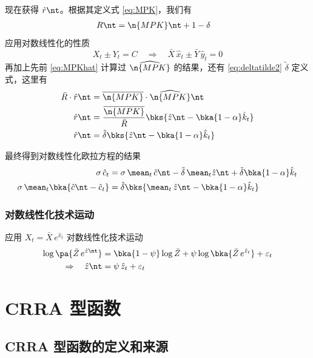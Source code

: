 现在获得 \(\hat r\nt\)。根据其定义式 \ref{eq:MPK}，我们有
\begin{align*}
R\nt&=\n{MPK}\nt+1-\delta
\end{align*}
应用对数线性化的性质
\begin{equation*}
    X_t\pm Y_t=C\quad\Rightarrow\quad \bar X\,\hat x_t\pm\bar Y\,\hat y_t=0
\end{equation*}
再加上先前 \ref{eq:MPKhat} 计算过 \(\widehat{\n{MPK}}\) 的结果，还有 \ref{eq:deltatilde2} \(\tilde\delta\) 定义式，这里有
\begin{align*}
    \bar R\cdot\hat r\nt&=\overline{\n{MPK}} \cdot\widehat{\n{MPK}}\nt\\
    \hat r\nt&=\dfrac{\overline{\n{MPK}}}{\bar R}\bks{\hat z\nt-\bka{1-\alpha}\hat k_t}\\
    \hat r\nt&=\tilde\delta\bks{\hat z\nt-\bka{1-\alpha}\hat k_t}
\end{align*}

最终得到对数线性化欧拉方程的结果
\begin{align*}
    \sigma\,\hat c_t&=\sigma\,\mean_t\,\hat c\nt-\tilde\delta\,\mean_t\hat z\nt+\tilde\delta\bka{1-\alpha}\hat k_t\\
    \sigma\,\mean_t\bka{\hat c\nt-\hat c_t}&=\tilde\delta\bks{\mean_t\,\hat z\nt-\bka{1-\alpha}\hat k_t}
\end{align*}

\subsubsection{对数线性化技术运动}

应用 \(X_t=\bar X\,e^{\hat x_t}\) 对数线性化技术运动
\begin{align*}
    \log\pa{\bar Z\,e^{\hat z\nt}}&=\bka{1-\psi}\log\bar Z+\psi\log\bka{\bar Z\,e^{\hat z_t}}+\varepsilon_t\\
    \Rightarrow\quad \hat z\nt&=\psi\,\hat z_t+\varepsilon_t
\end{align*}

\section{CRRA 型函数}\label{sec:CRRA}

\subsection{CRRA 型函数的定义和来源}\label{subsec:CRRAdef}

